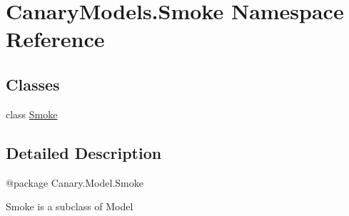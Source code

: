 \hypertarget{namespace_canary_models_1_1_smoke}{\section{Canary\-Models.\-Smoke Namespace Reference}
\label{namespace_canary_models_1_1_smoke}
}
\subsection*{Classes}
\begin{DoxyCompactItemize}
\item 
class \hyperlink{class_canary_models_1_1_smoke_1_1_smoke}{Smoke}
\end{DoxyCompactItemize}


\subsection{Detailed Description}
\begin{DoxyVerb}@package Canary.Model.Smoke

Smoke is a subclass of Model
\end{DoxyVerb}
 